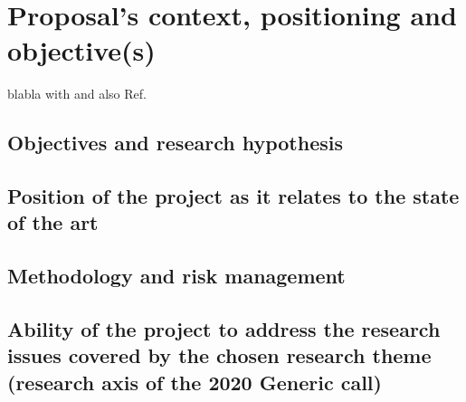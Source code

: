 
\section{Proposal’s context, positioning and objective(s)}

blabla with\supercite{Dumur2015} and also Ref.~\cite{Dumur2021}

\subsection{Objectives and research hypothesis}

\subsection{Position of the project as it relates to the state of the art}

\subsection{Methodology and risk management}

\subsection{Ability of the project to address the research issues covered by the chosen research theme (research axis of the 2020 Generic call)}